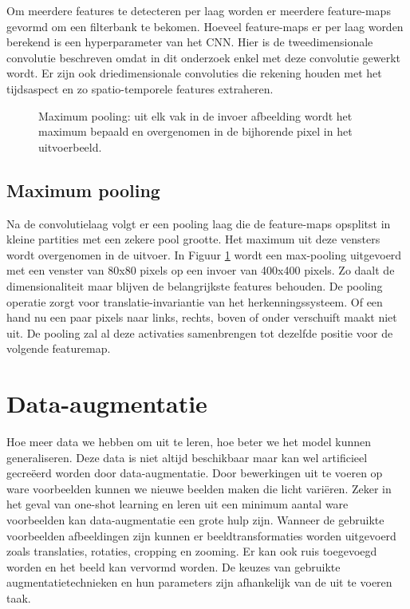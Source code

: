 \npar Om meerdere features te detecteren per laag worden er meerdere feature-maps gevormd om een filterbank te bekomen. Hoeveel feature-maps er per laag worden berekend is een hyperparameter van het CNN. Hier is de tweedimensionale convolutie beschreven omdat in dit onderzoek enkel met deze convolutie gewerkt wordt. Er zijn ook driedimensionale convoluties die rekening houden met het tijdsaspect en zo spatio-temporele features extraheren.

\begin{figure}[b!]
	\centering
	
	\caption{Maximum pooling: uit elk vak in de invoer afbeelding wordt het maximum bepaald en overgenomen in de bijhorende pixel in het uitvoerbeeld.}
	\label{fig:max-pooling}
\end{figure}\textsl{\textsl{}}
\subsection{Maximum pooling}


Na de convolutielaag volgt er een pooling laag die de feature-maps opsplitst in kleine partities met een zekere pool grootte. Het maximum uit deze vensters wordt overgenomen in de uitvoer. In Figuur \ref{fig:max-pooling} wordt een max-pooling uitgevoerd met een venster van 80x80 pixels op een invoer van 400x400 pixels. Zo daalt de dimensionaliteit maar blijven de belangrijkste features behouden.
\npar De pooling operatie zorgt voor translatie-invariantie van het herkenningssysteem. Of een hand nu een paar pixels naar links, rechts, boven of onder verschuift maakt niet uit. De pooling zal al deze activaties samenbrengen tot dezelfde positie voor de volgende featuremap. 

\section{Data-augmentatie}\label{sec:data-augm}
Hoe meer data we hebben om uit te leren, hoe beter we het model kunnen generaliseren. Deze data is niet altijd beschikbaar maar kan wel artificieel gecre\"eerd worden door data-augmentatie. Door bewerkingen uit te voeren op ware voorbeelden kunnen we nieuwe beelden maken die licht vari\"eren.
\npar Zeker in het geval van one-shot learning en leren uit een minimum aantal ware voorbeelden kan data-augmentatie een grote hulp zijn. Wanneer de gebruikte voorbeelden afbeeldingen zijn kunnen er beeldtransformaties worden uitgevoerd zoals translaties, rotaties, cropping en zooming. Er kan ook ruis toegevoegd worden en het beeld kan vervormd worden. De keuzes van gebruikte augmentatietechnieken en hun parameters zijn afhankelijk van de uit te voeren taak. 
